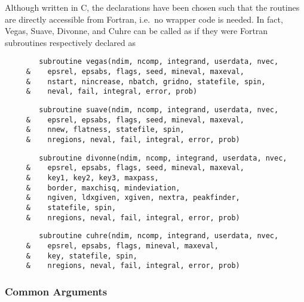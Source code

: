 \documentclass[12pt]{article}
\newcommand\ie{i.e.\ }
\begin{document}
Although written in C, the declarations have been chosen such that the
routines are directly accessible from Fortran, \ie no wrapper code is
needed.  In fact, Vegas, Suave, Divonne, and Cuhre can be called as if 
they were Fortran subroutines respectively declared as
\begin{verbatim}
        subroutine vegas(ndim, ncomp, integrand, userdata, nvec,
     &    epsrel, epsabs, flags, seed, mineval, maxeval,
     &    nstart, nincrease, nbatch, gridno, statefile, spin,
     &    neval, fail, integral, error, prob)
\end{verbatim}
\begin{verbatim}
        subroutine suave(ndim, ncomp, integrand, userdata, nvec,
     &    epsrel, epsabs, flags, seed, mineval, maxeval,
     &    nnew, flatness, statefile, spin,
     &    nregions, neval, fail, integral, error, prob)
\end{verbatim}
\begin{verbatim}
        subroutine divonne(ndim, ncomp, integrand, userdata, nvec,
     &    epsrel, epsabs, flags, seed, mineval, maxeval,
     &    key1, key2, key3, maxpass,
     &    border, maxchisq, mindeviation,
     &    ngiven, ldxgiven, xgiven, nextra, peakfinder,
     &    statefile, spin,
     &    nregions, neval, fail, integral, error, prob)
\end{verbatim}
\begin{verbatim}
        subroutine cuhre(ndim, ncomp, integrand, userdata, nvec,
     &    epsrel, epsabs, flags, mineval, maxeval,
     &    key, statefile, spin,
     &    nregions, neval, fail, integral, error, prob)
\end{verbatim}


\subsubsection{Common Arguments}
\label{sect:commonargs}
\end{document}
